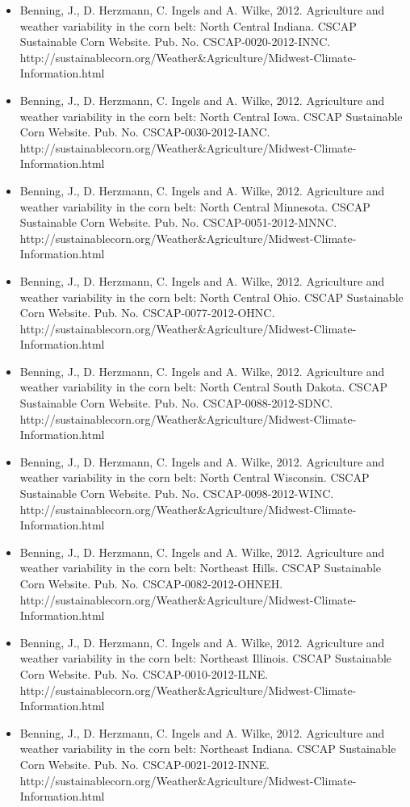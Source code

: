 \begin{itemize}
\item Benning, J., D. Herzmann, C. Ingels and A. Wilke, 2012. Agriculture and weather variability in the corn belt: North Central Indiana. CSCAP Sustainable Corn Website. Pub. No. CSCAP-0020-2012-INNC. http://sustainablecorn.org/Weather\&Agriculture/Midwest-Climate-Information.html
\item Benning, J., D. Herzmann, C. Ingels and A. Wilke, 2012. Agriculture and weather variability in the corn belt: North Central Iowa. CSCAP Sustainable Corn Website. Pub. No. CSCAP-0030-2012-IANC. http://sustainablecorn.org/Weather\&Agriculture/Midwest-Climate-Information.html
\item Benning, J., D. Herzmann, C. Ingels and A. Wilke, 2012. Agriculture and weather variability in the corn belt: North Central Minnesota. CSCAP Sustainable Corn Website. Pub. No. CSCAP-0051-2012-MNNC. http://sustainablecorn.org/Weather\&Agriculture/Midwest-Climate-Information.html
\item Benning, J., D. Herzmann, C. Ingels and A. Wilke, 2012. Agriculture and weather variability in the corn belt: North Central Ohio. CSCAP Sustainable Corn Website. Pub. No. CSCAP-0077-2012-OHNC. http://sustainablecorn.org/Weather\&Agriculture/Midwest-Climate-Information.html
\item Benning, J., D. Herzmann, C. Ingels and A. Wilke, 2012. Agriculture and weather variability in the corn belt: North Central South Dakota. CSCAP Sustainable Corn Website. Pub. No. CSCAP-0088-2012-SDNC. http://sustainablecorn.org/Weather\&Agriculture/Midwest-Climate-Information.html
\item Benning, J., D. Herzmann, C. Ingels and A. Wilke, 2012. Agriculture and weather variability in the corn belt: North Central Wisconsin. CSCAP Sustainable Corn Website. Pub. No. CSCAP-0098-2012-WINC. http://sustainablecorn.org/Weather\&Agriculture/Midwest-Climate-Information.html
\item Benning, J., D. Herzmann, C. Ingels and A. Wilke, 2012. Agriculture and weather variability in the corn belt: Northeast Hills. CSCAP Sustainable Corn Website. Pub. No. CSCAP-0082-2012-OHNEH. http://sustainablecorn.org/Weather\&Agriculture/Midwest-Climate-Information.html
\item Benning, J., D. Herzmann, C. Ingels and A. Wilke, 2012. Agriculture and weather variability in the corn belt: Northeast Illinois. CSCAP Sustainable Corn Website. Pub. No. CSCAP-0010-2012-ILNE. http://sustainablecorn.org/Weather\&Agriculture/Midwest-Climate-Information.html
\item Benning, J., D. Herzmann, C. Ingels and A. Wilke, 2012. Agriculture and weather variability in the corn belt: Northeast Indiana. CSCAP Sustainable Corn Website. Pub. No. CSCAP-0021-2012-INNE. http://sustainablecorn.org/Weather\&Agriculture/Midwest-Climate-Information.html

\end{itemize}
